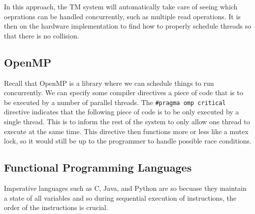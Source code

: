 \documentclass{tufte-handout}
\begin{document}
In this approach, the TM system will automatically take care of seeing which 
oeprations can be handled concurrently, such as multiple read operations.
It is then on the hardware implementation to find how to properly schedule 
threads so that there is no collision.

\subsection{OpenMP}
Recall that OpenMP is a library where we can schedule things to run concurrently. 
We can specify some compiler directives a piece of code that is to be executed
by a number of parallel threads. The \texttt{\#pragma omp critical} directive 
indicates that the following piece of code is to be only executed by a single thread.
This is to inform the rest of the system to only allow one thread to execute 
at the same time. This directive then functions more or less like a mutex lock,
so it would still be up to the programmer to handle possible race conditions.

\subsection{Functional Programming Languages}
Imperative languages such as C, Java, and Python are so becuase they maintain 
a  state of all variables and so during sequential execution of instructions,
the order of the instructions is crucial.
\end{document}
